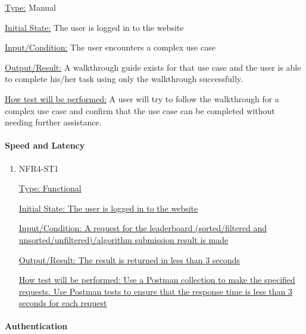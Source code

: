\documentclass[12pt, titlepage]{article}
\begin{document}
\begin{enumerate}
\underline{Type:} Manual

\underline{Initial State:} The user is logged in to the website

\underline{Input/Condition:} The user encounters a complex use case

\underline{Output/Result:} A walkthrough guide exists for that use case and the user is able to complete his/her task using only the walkthrough successfully.

\underline{How test will be performed:} 
A user will try to follow the walkthrough for a complex use case and confirm that the use case can be completed without needing further assistance.

\end{enumerate}

\paragraph{Speed and Latency}

\begin{enumerate}

\item{NFR4-ST1\\}

\underline{Type: Functional} 

\underline{Initial State: The user is logged in to the website} 

\underline{Input/Condition:  A request for the leaderboard (sorted/filtered and unsorted/unfiltered)/algorithm submission result is made} 

\underline{Output/Result: The result is returned in less than 3 seconds} 

\underline{How test will be performed: Use a Postman collection to make the specified requests. Use Postman tests to ensure that the response time is less than 3 seconds for each request} 

\end{enumerate}

\paragraph{Authentication}
\end{document}
